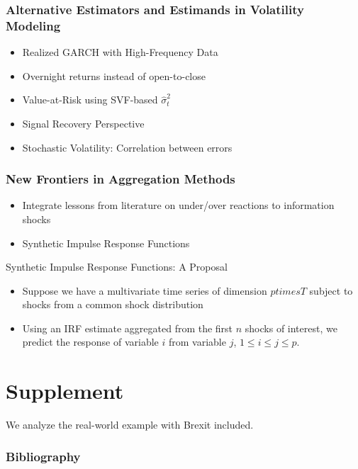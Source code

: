 \documentclass{beamer}
\theoremstyle{definition}
\begin{document}
\begin{frame}
    \frametitle{Alternative Estimators and Estimands in Volatility Modeling}
    \begin{itemize}
        \item{Realized GARCH with High-Frequency Data}
        
        \item{Overnight returns instead of open-to-close}
        
        \item{Value-at-Risk using SVF-based $\hat\sigma^{2}_{t}$}
        
        \item{Signal Recovery Perspective \parencite{ferwana2022optimal}}
        
        \item{Stochastic Volatility: Correlation between errors}
        
        \end{itemize}
\end{frame}
   
\begin{frame}
    \frametitle{New Frontiers in Aggregation Methods}
    \begin{itemize}
        \item Integrate lessons from literature on under/over reactions to information shocks \parencite[][]{jiang2017information}
        \item{Synthetic Impulse Response Functions}
        \end{itemize}
\end{frame}

\begin{frame}{Synthetic Impulse Response Functions: A Proposal}
    \begin{itemize}
        \item Suppose we have a multivariate time series of dimension $p times T$ subject to shocks from a common shock distribution
        \item Using an IRF estimate aggregated from the first $n$ shocks of interest, we predict the response of variable $i$ from variable $j$, $1\leq i \leq j \leq p$. 
    \end{itemize}
    
\end{frame}
\section{Supplement}
We analyze the real-world example with Brexit included.

\begin{frame}
    \frametitle{Bibliography}

\printbibliography
\end{frame}
\end{document}
